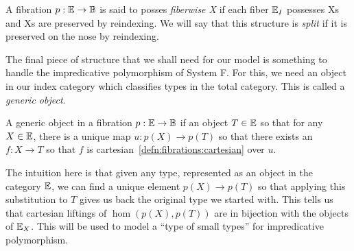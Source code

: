 \begin{defn}\label{defn:fibrations:fiberwiseX}
  A fibration $p : \mathbb{E} \to \mathbb{B}$ is said to posses \emph{fiberwise
    X} if each fiber $\mathbb{E}_I$ possesses Xs and Xs are preserved by
  reindexing. We will say that this structure is \emph{split} if it is
  preserved on the nose by reindexing.
\end{defn}

The final piece of structure that we shall need for our model is
something to handle the impredicative polymorphism of System F. For
this, we need an object in our index category which classifies types
in the total category. This is called a \emph{generic object}.

\begin{defn}\label{defn:fibrations:genericobject}
  A generic object in a fibration $p : \mathbb{E} \to \mathbb{B}$ if an object
  $T \in \mathbb{E}$ so that for any $X \in \mathbb{E}$, there is a unique map
  $u : p(X) \to p(T)$ so that there exists an $f : X \to T$ so that
  $f$ is cartesian~\ref{defn:fibrations:cartesian} over $u$.
\end{defn}

The intuition here is that given any type, represented as an object in
the category $\mathbb{E}$, we can find a unique element $p(X) \to p(T)$ so
that applying this substitution to $T$ gives us back the original type
we started with. This tells us that cartesian liftings of
$\hom(p(X), p(T))$ are in bijection with the objects of
$\mathbb{E}_X$. This will be used to model a ``type of small types'' for
impredicative polymorphism.
